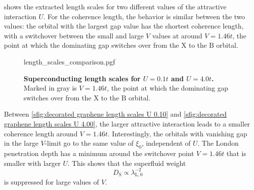 \documentclass[../notes.tex]{subfiles}
\begin{document}
 shows the extracted length scales for two different values of the attractive interaction \(U\).
For the coherence length, the behavior is similar between the two values: the orbital with the largest gap value has the shortest coherence length, with a switchover between the small and large \(V\) values at around \(V = 1.46t\), the point at which the dominating gap switches over from the \(\mathrm{X}\) to the \(\mathrm{B}\) orbital. %
\begin{figure}[!tb]
	\centering
	{length_scales_comparison.pgf}
	\caption[Superconducting length scales.]{
		\textbf{Superconducting length scales for \(U = 0.1t\) and \(U = 4.0t\).} Marked in gray is \(V = 1.46t\), the point at which the dominating gap switches over from the \(\mathrm{X}\) to the \(\mathrm{B}\) orbital.
	}
	\label{fig:decorated graphene length scales}
\end{figure}
Between \cref{sfig:decorated graphene length scales U 0.10} and \cref{sfig:decorated graphene length scales U 4.00}, the larger attractive interaction leads to a smaller coherence length around \(V = 1.46t\).
Interestingly, the orbitals with vanishing gap in the large \(V\)-limit go to the same value of \(\xi_0\), independent of \(U\).
The London penetration depth has a minimum around the switchover point \(V = 1.46t\) that is smaller with larger \(U\).
This shows that the superfluid weight
\begin{equation}
	D_{\mathrm{S}} \propto \lambda_{\mathrm{L}, 0}^{-2}
\end{equation}
is suppressed for large values of \(V\).
\end{document}
